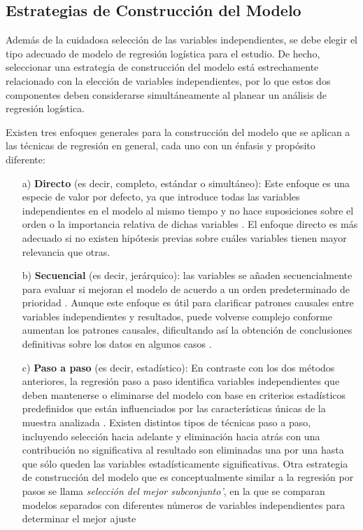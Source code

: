 \documentclass[12pt]{article}
\begin{document}
\subsection{Estrategias de Construcci\'on del Modelo}
Adem\'as de la cuidadosa selecci\'on de las variables independientes, se debe elegir el tipo adecuado de modelo de regresi\'on log\'istica para el estudio. De hecho, seleccionar una estrategia de construcci\'on del modelo est\'a estrechamente relacionado con la elecci\'on de variables independientes, por lo que estos dos componentes deben considerarse simult\'aneamente al planear un an\'alisis de regresi\'on log\'istica.

Existen tres enfoques generales para la construcci\'on del modelo que se aplican a las t\'ecnicas de regresi\'on en general, cada uno con un \'enfasis y prop\'osito diferente: 
\begin{itemize}
\item[a) ] \textbf{Directo} (es decir, completo, est\'andar o simult\'aneo): Este enfoque es una especie de valor por defecto, ya que introduce todas las variables independientes en el modelo al mismo tiempo y no hace suposiciones sobre el orden o la importancia relativa de dichas variables \cite{darlington1990,tabachnick2007}. El enfoque directo es m\'as adecuado si no existen hip\'otesis previas sobre cu\'ales variables tienen mayor relevancia que otras. 

\item[ b) ] \textbf{Secuencial} (es decir, jer\'arquico):  las variables se a\~naden secuencialmente para evaluar si mejoran el modelo de acuerdo a un orden predeterminado de prioridad \cite{darlington1990,tabachnick2007}. Aunque este enfoque es \'util para clarificar patrones causales entre variables independientes y resultados, puede volverse complejo conforme aumentan los patrones causales, dificultando as\'i la obtenci\'on de conclusiones definitivas sobre los datos en algunos casos \cite{darlington1990}.

\item[c) ] \textbf{Paso a paso} (es decir, estad\'istico): En contraste con los dos m\'etodos anteriores, la regresi\'on paso a paso identifica variables independientes que deben mantenerse o eliminarse del modelo con base en criterios estad\'isticos predefinidos que est\'an influenciados por las caracter\'isticas \'unicas de la muestra analizada \cite{tabachnick2007,hosmer2000}. Existen distintos tipos de t\'ecnicas paso a paso, incluyendo selecci\'on hacia adelante y eliminaci\'on hacia atr\'as con una contribuci\'on no significativa al resultado son eliminadas una por una hasta que s\'olo queden las variables estad\'isticamente significativas.\cite{darlington1990, hosmer2000} Otra estrategia de construcci\'on del modelo que es conceptualmente similar a la regresi\'on por pasos se llama \textit{selecci\'on del mejor subconjunto'}, en la que se comparan modelos separados con diferentes n\'umeros de variables independientes para determinar el mejor ajuste \cite{hosmer2000}
\end{itemize}
\end{document}
